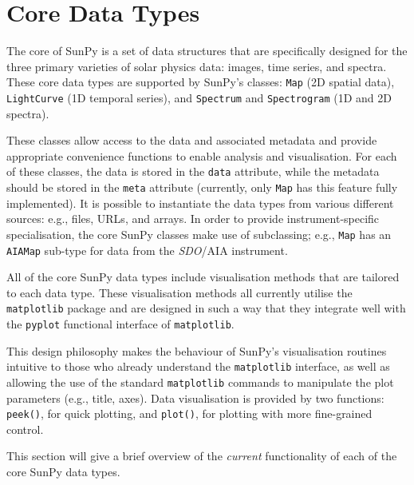 \section{Core Data Types}\label{sec:DataTypes}

The core of SunPy is a set of data structures that are specifically designed for the
three primary varieties of solar physics data: images, time series, and
spectra. These core data types are supported by SunPy's classes:
\texttt{Map} (2D spatial data), \texttt{LightCurve} (1D temporal series),
and \texttt{Spectrum} and \texttt{Spectrogram} (1D and 2D spectra). 

These classes allow access to the data
and associated metadata and provide appropriate convenience functions to
enable analysis and visualisation. For each of these classes, the data is
stored in the \texttt{data} attribute, while the metadata should be stored 
in the \texttt{meta} attribute (currently, only \texttt{Map} has this feature 
fully implemented). 
It is possible to instantiate the
data types from various
different sources: e.g., files, URLs, and arrays.  
In order to provide instrument-specific specialisation, the core SunPy classes 
make use of subclassing; e.g., \texttt{Map} has an \texttt{AIAMap} 
sub-type for data from the \textit{SDO}/AIA instrument. 

All of the core SunPy data types 
include visualisation methods that are tailored to each data type. 
These visualisation methods all currently utilise the \texttt{matplotlib} 
package and are designed in such a way that they integrate well with 
the \texttt{pyplot} functional interface of \texttt{matplotlib}.

This design philosophy makes the behaviour of SunPy's visualisation 
routines intuitive to those who already understand the \texttt{matplotlib}
interface, as well as allowing the use of the standard 
\texttt{matplotlib} commands to manipulate the plot parameters (e.g., title, axes).
Data visualisation is provided by two functions: \texttt{peek()}, for quick 
plotting, and \texttt{plot()}, for plotting with more fine-grained control.

This section will give a brief overview of the \textit{current} functionality 
of each of the core SunPy data types.



